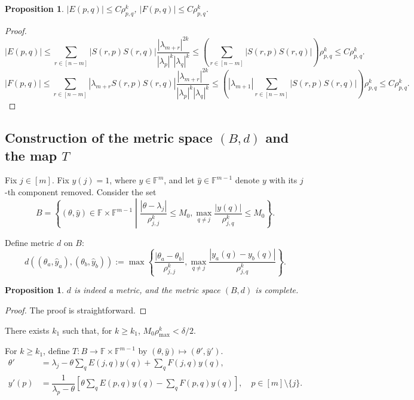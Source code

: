 \documentclass[11pt,a4paper]{article}
\theoremstyle{plain}              %
\newtheorem{proposition}[theorem]{Proposition}
\theoremstyle{definition}         %
\begin{document}
\begin{proposition}
\(|E(p,q)|\leq C\rho_{p,q}^k\), \(|F(p,q)|\leq C\rho_{p,q}^k\).
\end{proposition}
\begin{proof}
\[
|E(p,q)|\leq\sum_{r\in[n-m]}|S(r,p)S(r,q)|\dfrac{|\lambda_{m+r}|^{2k}}{|\lambda_p|^k|\lambda_q|^k}\leq\left(\sum_{r\in[n-m]}|S(r,p)S(r,q)|\right)\rho_{p,q}^k\leq C\rho_{p,q}^k.
\]
\[
|F(p,q)|\leq\sum_{r\in[n-m]}|\lambda_{m+r}S(r,p)S(r,q)|\dfrac{|\lambda_{m+r}|^{2k}}{|\lambda_p|^k|\lambda_q|^k}\leq\left(|\lambda_{m+1}|\sum_{r\in[n-m]}|S(r,p)S(r,q)|\right)\rho_{p,q}^k\leq C\rho_{p,q}^k.
\]
\end{proof}

\subsection{Construction of the metric space \((B,d)\) and the map \(T\)}

Fix \(j\in[m]\). Fix \(y(j)=1\), where \(y\in\mathbb{F}^m\), and let \(\hat{y}\in\mathbb{F}^{m-1}\) denote \(y\) with its \(j\)-th component removed. Consider the set
\[
B=\left\{(\theta,\hat{y})\in\mathbb{F}\times\mathbb{F}^{m-1}\middle|\dfrac{|\theta-\lambda_j|}{\rho_{j,j}^k}\leq M_0,\max_{q\neq j}\dfrac{|y(q)|}{\rho_{j,q}^k}\leq M_0\right\}.
\]

Define metric \(d\) on \(B\):
\[
d((\theta_a,\hat{y}_a),(\theta_b,\hat{y}_b)):=\max\left\{\dfrac{|\theta_a-\theta_b|}{\rho_{j,j}^k},\max_{q\neq j}\dfrac{|y_a(q)-y_b(q)|}{\rho_{j,q}^k}\right\}.
\]

\begin{proposition}
\(d\) is indeed a metric, and the metric space \((B,d)\) is complete.
\end{proposition}
\begin{proof}
The proof is straightforward.
\end{proof}

There exists \(k_1\) such that, for \(k\geq k_1\), \(M_0\rho_{\max}^k<\delta/2\).

For \(k\geq k_1\), define \(T:B\to\mathbb{F}\times\mathbb{F}^{m-1}\) by \((\theta,\hat{y})\mapsto(\theta',\hat{y}')\).
\begin{align*}
\theta'&=\lambda_j-\theta\sum_{q}E(j,q)y(q)+\sum_{q}F(j,q)y(q),\\
y'(p)&=\dfrac{1}{\lambda_p-\theta}\left[\theta\sum_{q}E(p,q)y(q)-\sum_{q}F(p,q)y(q)\right],\quad p\in[m]\setminus\{j\}.
\end{align*}
\end{document}
